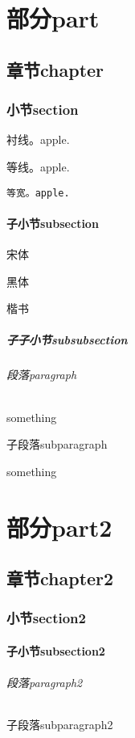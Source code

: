 \documentclass{zlhywlfbook}
\begin{document}

% 
% 
\part{部分part}
\chapter{章节chapter}
\section{小节section}
 {\rm 衬线。apple.\par}
 {\sf 等线。apple.\par}
 {\tt 等宽。apple.\par}
\subsection{子小节subsection}
{\fangsong 宋体 \par}
{\heiti 黑体\par}
{\kaishu 楷书\par}
\subsubsection{子子小节subsubsection}
\contentsname\par
\listfigurename\par
\listtablename\par
\figurename\par
\tablename\par
\abstractname\par
\indexname\par
\appendixname\par
\bibname\par
\proofname\par
\newpage
\paragraph{段落paragraph}
something
\newpage
\subparagraph{子段落subparagraph}
something

\part{部分part2}
\chapter{章节chapter2}
\section{小节section2}
\subsection{子小节subsection2}
\paragraph{段落paragraph2}
\subparagraph{子段落subparagraph2}
\end{document}
